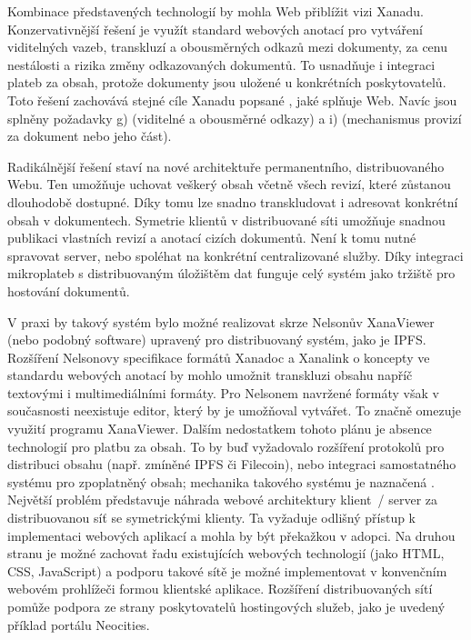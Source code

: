 Kombinace představených technologií by mohla Web přiblížit vizi Xanadu.
Konzervativnější řešení je využít standard webových anotací pro vytváření viditelných vazeb, transkluzí a obousměrných odkazů mezi dokumenty, za cenu nestálosti a rizika změny odkazovaných dokumentů. To usnadňuje i integraci plateb za obsah, protože dokumenty jsou uložené u konkrétních poskytovatelů. 
Toto řešení zachovává stejné cíle Xanadu popsané , jaké splňuje Web. Navíc jsou splněny požadavky g) (viditelné a obousměrné odkazy) a i) (mechanismus provizí za dokument nebo jeho část).

Radikálnější řešení staví na nové architektuře permanentního, distribuovaného Webu. Ten umožňuje uchovat veškerý obsah včetně všech revizí, které zůstanou dlouhodobě dostupné. Díky tomu lze snadno transkludovat i adresovat konkrétní obsah v dokumentech. Symetrie klientů v distribuované síti umožňuje snadnou publikaci vlastních revizí a anotací cizích dokumentů. Není k tomu nutné spravovat server, nebo spoléhat na konkrétní centralizované služby. Díky integraci mikroplateb s distribuovaným úložištěm dat funguje celý systém jako tržiště pro hostování dokumentů.

V praxi by takový systém bylo možné realizovat skrze Nelsonův XanaViewer (nebo podobný software) upravený pro distribuovaný systém, jako je IPFS.
Rozšíření Nelsonovy specifikace formátů Xanadoc a Xanalink o koncepty ve standardu webových anotací by mohlo umožnit transkluzi obsahu napříč textovými i multimediálními formáty. Pro Nelsonem navržené formáty však v současnosti neexistuje editor, který by je umožňoval vytvářet. To značně omezuje využití programu XanaViewer. Dalším nedostatkem tohoto plánu je absence technologií pro platbu za obsah. To by buď vyžadovalo rozšíření protokolů pro distribuci obsahu (např. zmíněné IPFS či Filecoin), nebo integraci samostatného systému pro zpoplatněný obsah; mechanika takového systému je naznačená . Největší problém představuje náhrada webové architektury klient~/ server za distribuovanou síť se symetrickými klienty.
Ta vyžaduje odlišný přístup k implementaci webových aplikací a mohla by být překažkou v adopci. Na druhou stranu je možné zachovat řadu existujících webových technologií (jako HTML, CSS, JavaScript) a podporu takové sítě je možné implementovat v konvenčním webovém prohlížeči formou klientské aplikace. 
Rozšíření distribuovaných sítí pomůže podpora ze strany poskytovatelů hostingových služeb, jako je uvedený příklad portálu Neocities.

